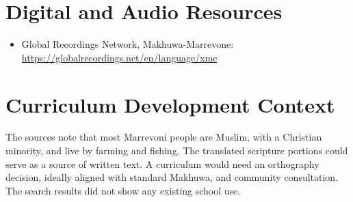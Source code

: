 \documentclass[12pt]{article}
\begin{document}
\section{Digital and Audio Resources}
\begin{itemize}
\item Global Recordings Network, Makhuwa-Marrevone: \url{https://globalrecordings.net/en/language/xmc}
\end{itemize}

\section{Curriculum Development Context}
The sources note that most Marrevoni people are Muslim, with a Christian minority, and live by farming and fishing. The translated scripture portions could serve as a source of written text. A curriculum would need an orthography decision, ideally aligned with standard Makhuwa, and community consultation. The search results did not show any existing school use.
\end{document}
